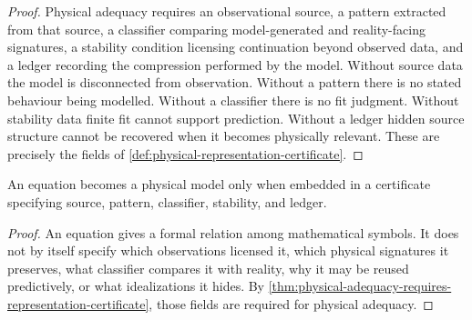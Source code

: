 \begin{proof}
Physical adequacy requires an observational source, a pattern extracted from that source, a classifier comparing model-generated and reality-facing signatures, a stability condition licensing continuation beyond observed data, and a ledger recording the compression performed by the model. Without source data the model is disconnected from observation. Without a pattern there is no stated behaviour being modelled. Without a classifier there is no fit judgment. Without stability data finite fit cannot support prediction. Without a ledger hidden source structure cannot be recovered when it becomes physically relevant. These are precisely the fields of \autoref{def:physical-representation-certificate}.
\end{proof}

\begin{corollary}
\label{cor:equation-not-yet-physical-model}
An equation becomes a physical model only when embedded in a certificate specifying source, pattern, classifier, stability, and ledger.
\end{corollary}

\begin{proof}
An equation gives a formal relation among mathematical symbols. It does not by itself specify which observations licensed it, which physical signatures it preserves, what classifier compares it with reality, why it may be reused predictively, or what idealizations it hides. By \autoref{thm:physical-adequacy-requires-representation-certificate}, those fields are required for physical adequacy.
\end{proof}












